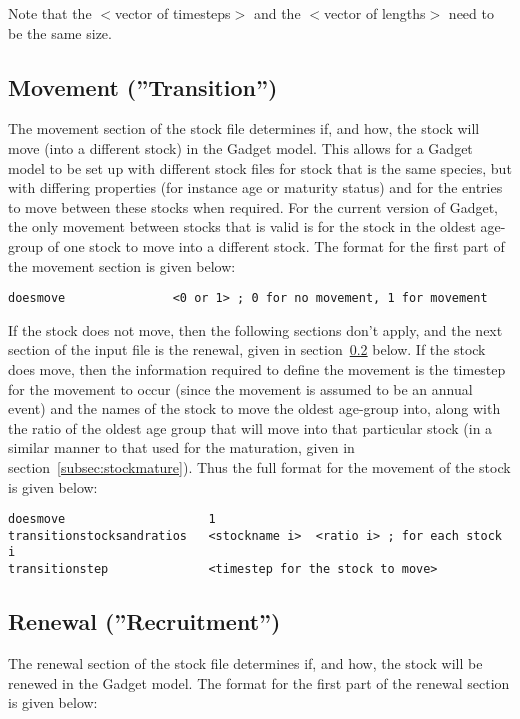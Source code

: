 \documentclass [a4paper, 10pt]{book}
\begin{document}
Note that the $<$vector of timesteps$>$ and the $<$vector of lengths$>$ need to be the same size.

\subsection{Movement (''Transition'')}\label{subsec:stockmove}
The movement section of the stock file determines if, and how, the stock will move (into a different stock) in the Gadget model.  This allows for a Gadget model to be set up with different stock files for stock that is the same species, but with differing properties (for instance age or maturity status) and for the entries to move between these stocks when required.  For the current version of Gadget, the only movement between stocks that is valid is for the stock in the oldest age-group of one stock to move into a different stock.  The format for the first part of the movement section is given below:

{\small\begin{verbatim}
doesmove               <0 or 1> ; 0 for no movement, 1 for movement
\end{verbatim}}

If the stock does not move, then the following sections don't apply, and the next section of the input file is the renewal, given in section~\ref{subsec:stockrenew} below.  If the stock does move, then the information required to define the movement is the timestep for the movement to occur (since the movement is assumed to be an annual event) and the names of the stock to move the oldest age-group into, along with the ratio of the oldest age group that will move into that particular stock (in a similar manner to that used for the maturation, given in section~\ref{subsec:stockmature}).  Thus the full format for the movement of the stock is given below:

{\small\begin{verbatim}
doesmove                    1
transitionstocksandratios   <stockname i>  <ratio i> ; for each stock i
transitionstep              <timestep for the stock to move>
\end{verbatim}}

\subsection{Renewal (''Recruitment'')}\label{subsec:stockrenew}
The renewal section of the stock file determines if, and how, the stock will be renewed in the Gadget model. The format for the first part of the renewal section is given below:
\end{document}
